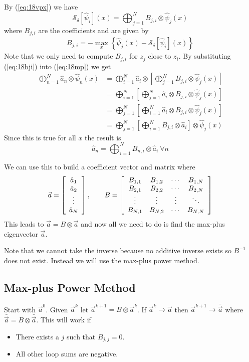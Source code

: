 By (\ref{eq:18vpx}) we have
$$\mathcal{S}_\delta[\hat{\psi}_i](x) = \bigoplus_{j=1}^N B_{j,i}\otimes\hat{\psi}_j(x)$$
where $B_{j,i}$ are the coefficients and are given by
\begin{align}
\label{eq:18bji}
B_{j,i} = -\max_x\left\lbrace \hat{\psi}_j(x) - \mathcal{S}_\delta[\hat{\psi}_i](x) \right\rbrace
\end{align}
Note that we only need to compute $B_{j,i}$ for $z_j$ close to $z_i$.
By substituting (\ref{eq:18bji}) into (\ref{eq:18mp}) we get
\begin{align*}
\bigoplus_{n=1}^N\hat{a}_n\otimes\hat{\psi}_n(x) &= \bigoplus_{i=1}^N\hat{a}_i\otimes\left[ \bigoplus_{j=1}^N B_{j,i}\otimes\hat{\psi}_j(x)\right] \\
&= \bigoplus_{i=1}^N\left[\bigoplus_{j=1}^N\hat{a}_i\otimes B_{j,i}\otimes \hat{\psi}_j(x)\right] \\
&= \bigoplus_{j=1}^N\left[\bigoplus_{i=1}^N\hat{a}_i\otimes B_{j,i}\otimes \hat{\psi}_j(x)\right] \\
&= \bigoplus_{j=1}^N\left[\bigoplus_{i=1}^N B_{j,i}\otimes\hat{a}_i\right] \otimes \hat{\psi}_j(x)
\end{align*}
Since this is true for all $x$ the result is
$$\hat{a}_n = \bigoplus_{i=1}^N B_{n,i}\otimes\hat{a}_i~\forall n$$

We can use this to build a coefficient vector and matrix where
\begin{align*}
\vec{a} = \left[\begin{array}{c} \hat{a}_1 \\ \hat{a}_2 \\ \vdots \\ \hat{a}_N \end{array}\right], \qquad
B = \left[\begin{array}{c c c c} B_{1,1} & B_{1,2} & \cdots & B_{1,N} \\ B_{2,1} & B_{2,2} & \cdots & B_{2,N} \\ \vdots & \vdots & \vdots & \ddots \\ B_{N,1} & B_{N,2} & \cdots & B_{N,N} \end{array}\right]
\end{align*}
This leads to $\vec{a} = B\otimes\vec{a}$ and now all we need to do is find the max-plus eigenvector $\vec{a}$.

Note that we cannot take the inverse because no additive inverse exists so $B^{-1}$ does not exist.
Instead we will use the max-plus power method.

\subsection{Max-plus Power Method}
Start with $\vec{a}^0$.
Given $\vec{a}^k$ let $\vec{a}^{k+1}=B\otimes\vec{a}^k$.
If $\vec{a}^k\to\vec{a}$ then $\vec{a}^{k+1}\to\bar{\vec{a}}$ where $\bar{\vec{a}}=B\otimes\bar{\vec{a}}$.
This will work if
\begin{itemize}
\item There exists a $j$ such that $B_{j,j}=0$.
\item All other loop sums are negative.
\end{itemize}

